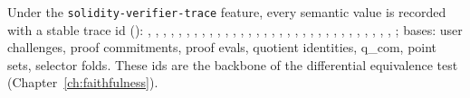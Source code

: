 Under the \texttt{solidity-verifier-trace} feature, every semantic value is
recorded with a stable trace id ():
, , ,
, , , ,
, , , ,
, , , ,
, , ,
, , ,
, , ,
, , ,
, , ,
, , ;
bases:  user challenges,  proof commitments,
 proof evals,  quotient identities,
 q\_\allowbreak{}com,  point sets,  selector
folds. These ids are the backbone of the differential equivalence test
(Chapter~\ref{ch:faithfulness}).

